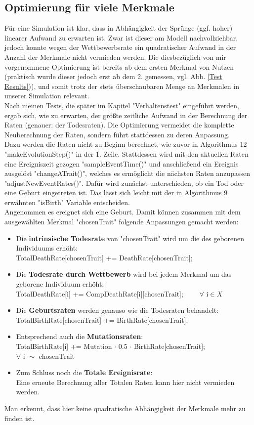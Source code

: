 \documentclass[11pt, a4paper, german]{article}
\theoremstyle{plain}
\begin{document}
	\subsection{Optimierung für viele Merkmale}
	Für eine Simulation ist klar, dass in Abhängigkeit der Sprünge (ggf. hoher) linearer Aufwand zu erwarten ist. Zwar ist dieser am Modell nachvollziehbar, jedoch konnte wegen der Wettbewerbsrate ein quadratischer Aufwand in der Anzahl der Merkmale nicht vermieden werden. Die diesbezüglich von mir vorgenommene Optimierung ist bereits ab dem ersten Merkmal von Nutzen (praktisch wurde dieser jedoch erst ab dem 2. gemessen, vgl. Abb. \ref{Test Results})), und somit trotz der stets überschaubaren Menge an Merkmalen in unserer Simulation relevant.\\
	Nach meinen Tests, die später im Kapitel "{}Verhaltenstest"{} eingeführt werden, ergab sich, wie zu erwarten, der größte zeitliche Aufwand in der Berechnung der Raten (genauer: der Todesraten). Die Optimierung vermeidet die komplette Neuberechnung der Raten, sondern führt stattdessen zu deren Anpassung.\\
	Dazu werden die Raten nicht zu Beginn berechnet, wie zuvor in Algorithmus 12 "{}makeEvolutionStep()"{} in der 1. Zeile. Stattdessen wird mit den aktuellen Raten eine Ereigniszeit gezogen "{}sampleEventTime()"{} und anschließend ein Ereignis ausgelöst "{}changeATrait()"{}, welches es ermöglicht die nächsten Raten anzupassen "{}adjustNewEventRates()"{}. Dafür wird zunächst unterschieden, ob ein Tod oder eine Geburt eingetreten ist. Das lässt sich leicht mit der in Algorithmus 9 erwähnten "{}isBirth"{} Variable entscheiden.\\
	Angenommen es ereignet sich eine Geburt. Damit können zusammen mit dem ausgewählten Merkmal "{}chosenTrait"{} folgende Anpassungen gemacht werden:
	\begin{itemize}
		\item Die \textbf{intrinsische Todesrate} von "{}chosenTrait"{} wird um  die des geborenen Individuums erhöht:\\ 
		TotalDeathRate[chosenTrait] += DeathRate[chosenTrait];
		\item Die \textbf{Todesrate durch Wettbewerb} wird bei jedem Merkmal um das geborene Individuum erhöht:\\
		TotalDeathRate[i] += CompDeathRate[i][chosenTrait]; $ \qquad \forall \text{ i} \in X $
		\item Die \textbf{Geburtsraten} werden genauso wie die Todesraten behandelt:\\
		TotalBirthRate[chosenTrait] += BirthRate[chosenTrait];
		\item Entsprechend auch die \textbf{Mutationsraten}:\\
		TotalBirthRate[i] += Mutation $ \cdot $ 0.5 $ \cdot $ BirthRate[chosenTrait]; \\
		$\forall \text{ i } \sim \text{ chosenTrait} $
		\item Zum Schluss noch die \textbf{Totale Ereignisrate}:\\
		Eine erneute Berechnung aller Totalen Raten kann hier nicht vermieden werden.
	\end{itemize}
	Man erkennt, dass hier keine quadratische Abhängigkeit der Merkmale mehr zu finden ist.
	
\end{document}
